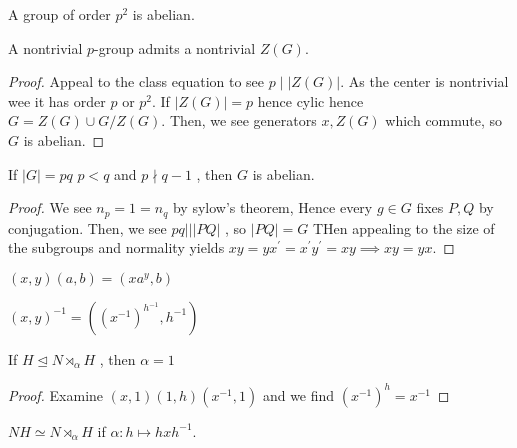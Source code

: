 \begin{theorem}
	A group of order \(p^2\) is abelian.
\end{theorem}
\begin{theorem}
	A nontrivial \(p\)-group admits a nontrivial \(Z\left( G \right) \).
\end{theorem}
\begin{proof}
	Appeal to the class equation to see \(p \mid \left| Z\left( G \right)  \right| \). As the center is nontrivial wee it has order \(p\) or \(p^2\). If \(\left| Z\left( G \right)  \right|  = p\) hence cylic hence \(G = Z\left( G \right) \cup G / Z\left( G \right) \). Then, we see generators \(x, Z\left( G \right) \) which commute, so \(G\) is abelian.
\end{proof}
\begin{theorem}
	If \(\left| G \right|  = pq\) \(p < q\)  and \(p \nmid q-1\) , then \(G\) is abelian.
\end{theorem}
\begin{proof}
	We see \(n_{p} = 1 = n_{q}\) by sylow's theorem, Hence every \(g \in G\) fixes \(P, Q\) by conjugation. Then, we see \(pq || \left| PQ \right| \) , so \(\left| PQ \right|  = G\)  THen appealing to the size of the subgroups and normality yields \(xy = yx^{\prime} = x^{\prime}y^{\prime} = xy \implies xy = yx\).
\end{proof}
\begin{definition}
	\(\left( x, y \right) \left( a, b \right)  = (xa^{y}, b)\)
\end{definition}
\begin{remark}
	\(\left( x, y \right) ^{-1} = \left( \left( x^{-1} \right) ^{h^{-1}} , h^{-1}\right) \)
\end{remark}
\begin{theorem}
	If \(H \trianglelefteq N \rtimes_{\alpha} H\) , then \(\alpha = 1\)
\end{theorem}
\begin{proof}
	Examine \(\left( x, 1 \right) \left( 1, h \right) \left( x^{-1}, 1 \right) \) and we find \(\left( x^{-1} \right)^{h} = x^{-1}\)
\end{proof}
\begin{theorem}
	\(NH \simeq N\rtimes_{\alpha} H\) if \(\alpha: h \mapsto hxh^{-1}\).
\end{theorem}
